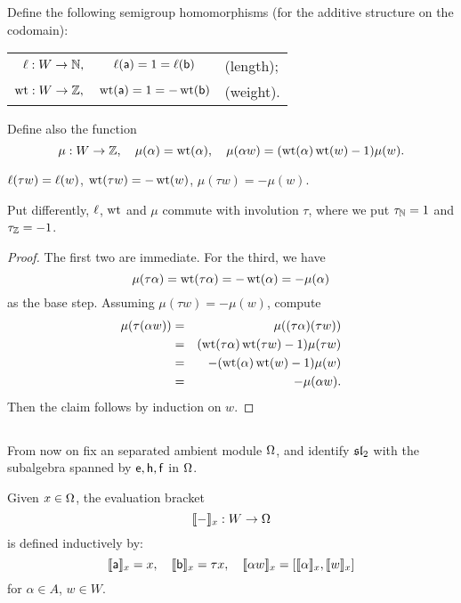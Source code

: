 Define the following semigroup homomorphisms (for the additive structure
on the codomain):
\begin{center}
\begin{tabular}{rcl}
$\l  : W \to \NN,$ & $\l(\a) = 1 = \l(\b)$ & (length); \\
$\wt : W \to \ZZ,$ & $ \wt(\a)=1 =-\wt(\b)$ &(weight). 
\end{tabular}\end{center}
Define also the function
\[
        \mu   : W \to\ZZ,\quad \mu(\alpha)=\wt(\alpha),\quad \mu(\alpha w)=(\wt(\alpha) \wt(w) - 1) \mu(w).
\]
\begin{lem}\label{lem:l-wt-mu-invol}
        $\l(\tau w)=\l(w)$, $\wt(\tau w)=-\wt(w)$, $\mu(\tau w)=-\mu(w)$.
\end{lem}
Put differently, $\l$, $\wt$ and $\mu$ commute with involution $\tau$, where we put
$\tau_\NN = 1$ and $\tau_\ZZ = -1$.

\begin{proof}
The first two are immediate. For the third, we have
\[ \mu(\tau\alpha)=\wt(\tau\alpha)=-\wt(\alpha)=-\mu(\alpha) \]
as the base step. Assuming
$\mu(\tau w)=-\mu(w)$, compute
\begin{eqnarray*}
        \mu(\tau(\alpha w)) &=& \mu((\tau\alpha)(\tau w)) \\ %
                            &=& (\wt(\tau\alpha)\wt(\tau w)-1)\mu(\tau w) \\ %
                            &=& -(\wt(\alpha)\wt(w) - 1)\mu(w) \\ %
                            &=& -\mu(\alpha w). %
\end{eqnarray*}
Then the claim follows by induction on $w$.                    
\end{proof}


\subsection{}
From now on fix an separated ambient module $\Om$, and identify $\sl_2$ with the subalgebra
spanned by $\e,\h,\f$ in $\Om$. 

Given $x\in\Om$, the evaluation bracket
\[
        \bkt{-}_x:W \to \Om
\]
is defined inductively by:
\[
        \bkt{\a}_x=x,\quad \bkt{\b}_x=\tau x,\quad \bkt{\alpha w}_x = [ \bkt{\alpha}_x, \bkt{w}_x ] 
\]
for $\alpha \in A$, $w \in W$.

